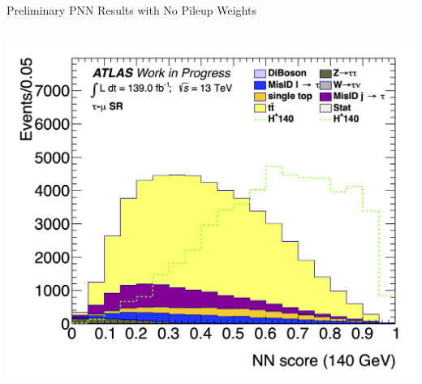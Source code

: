 \documentclass[aspectratio=169,xcolor=table]{beamer}
\begin{document}
\begin{frame}{Preliminary PNN Results with No Pileup Weights}
\begin{columns}
        \includegraphics[height=.24\textheight,keepaspectratio=true]{Scores/taulep/myOutDirClfEval_1p_noUpsilon_test_full/clf_score_GB200_mass_140to140_SR_TAUMU.png}


\end{columns}
\end{frame}
\end{document}
